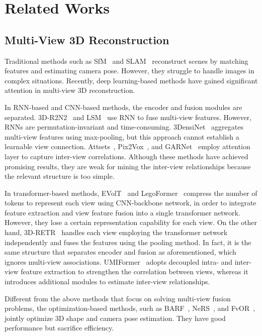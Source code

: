 \documentclass[10pt,twocolumn,letterpaper]{article}
\begin{document}
\section{Related Works}

\subsection{Multi-View 3D Reconstruction}
Traditional methods such as SfM~\cite{ozyecsil2017survey} and SLAM~\cite{fuentes2015visual} reconstruct scenes by matching features and estimating camera pose. However, they struggle to handle images in complex situations. Recently, deep learning-based methods have gained significant attention in multi-view 3D reconstruction.

In RNN-based and CNN-based methods, the encoder and fusion modules are separated. 3D-R2N2~\cite{choy20163d} and LSM~\cite{kar2017learning} use RNN to fuse multi-view features. However, RNNs are permutation-invariant and time-consuming. 3DensiNet~\cite{wang20173densinet} aggregates multi-view features using max-pooling, but this approach cannot establish a learnable view connection. Attsets~\cite{yang2020robust}, Pix2Vox~\cite{xie2019pix2vox,xie2020pix2vox++}, and GARNet~\cite{zhu2023garnet} employ attention layer to capture inter-view correlations. Although these methods have achieved promising results, they are weak for mining the inter-view relationships because the relevant structure is too simple.

In transformer-based methods, EVolT~\cite{wang2021multi} and LegoFormer~\cite{yagubbayli2021legoformer} compress the number of tokens to represent each view using CNN-backbone network, in order to integrate feature extraction and view feature fusion into a single transformer network. However, they lose a certain representation capability for each view. On the other hand, 3D-RETR~\cite{shi20213d} handles each view employing the transformer network independently and fuses the features using the pooling method. In fact, it is the same structure that separates encoder and fusion as aforementioned, which ignores multi-view associations. UMIFormer~\cite{zhu2023umi} adopts decoupled intra- and inter-view feature extraction to strengthen the correlation between views, whereas it introduces additional modules to estimate inter-view relationships.

Different from the above methods that focus on solving multi-view fusion problems, the optimization-based methods, such as BARF~\cite{lin2021barf}, NeRS~\cite{zhang2021ners}, and FvOR~\cite{yang2022fvor}, jointly optimize 3D shape and camera pose estimation. They have good performance but sacrifice efficiency.
\end{document}
